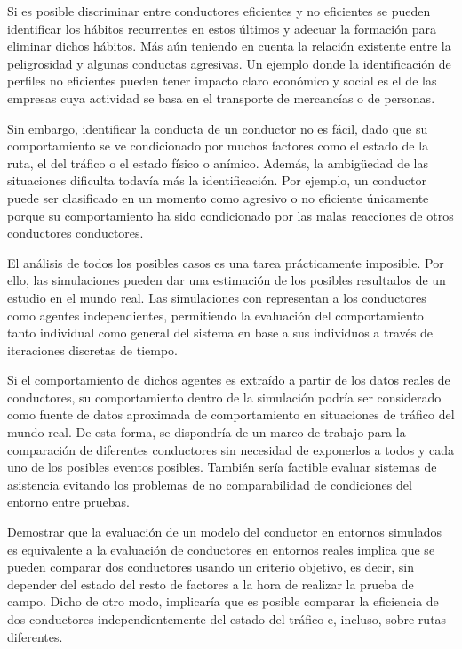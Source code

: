 Si es posible discriminar entre conductores eficientes y no eficientes se pueden identificar los hábitos recurrentes en estos últimos y adecuar la formación para eliminar dichos hábitos. Más aún teniendo en cuenta la relación existente entre la peligrosidad y algunas conductas agresivas. Un ejemplo donde la identificación de perfiles no eficientes pueden tener impacto claro económico y social es el de las empresas cuya actividad se basa en el transporte de mercancías o de personas.

Sin embargo, identificar la conducta de un conductor no es fácil, dado que su comportamiento se ve condicionado por muchos factores como el estado de la ruta, el del tráfico o el estado físico o anímico. Además, la ambigüedad de las situaciones dificulta todavía más la identificación. Por ejemplo, un conductor puede ser clasificado en un momento como agresivo o no eficiente únicamente porque su comportamiento ha sido condicionado por las malas reacciones de otros conductores conductores.

El análisis de todos los posibles casos es una tarea prácticamente imposible. Por ello, las simulaciones pueden dar una estimación de los posibles resultados de un estudio en el mundo real. Las simulaciones con  representan a los conductores como agentes independientes, permitiendo la evaluación del comportamiento tanto individual como general del sistema en base a sus individuos a través de iteraciones discretas de tiempo.

Si el comportamiento de dichos agentes es extraído a partir de los datos reales de conductores, su comportamiento dentro de la simulación podría ser considerado como fuente de datos aproximada de comportamiento en situaciones de tráfico del mundo real. De esta forma, se dispondría de un marco de trabajo para la comparación de diferentes conductores sin necesidad de exponerlos a todos y cada uno de los posibles eventos posibles. También sería factible evaluar sistemas de asistencia evitando los problemas de no comparabilidad de condiciones del entorno entre pruebas.

Demostrar que la evaluación de un modelo del conductor en entornos simulados es equivalente a la evaluación de conductores en entornos reales implica que se pueden comparar dos conductores usando un criterio objetivo, es decir, sin depender del estado del resto de factores a la hora de realizar la prueba de campo. Dicho de otro modo, implicaría que es posible comparar la eficiencia de dos conductores independientemente del estado del tráfico e, incluso, sobre rutas diferentes.

